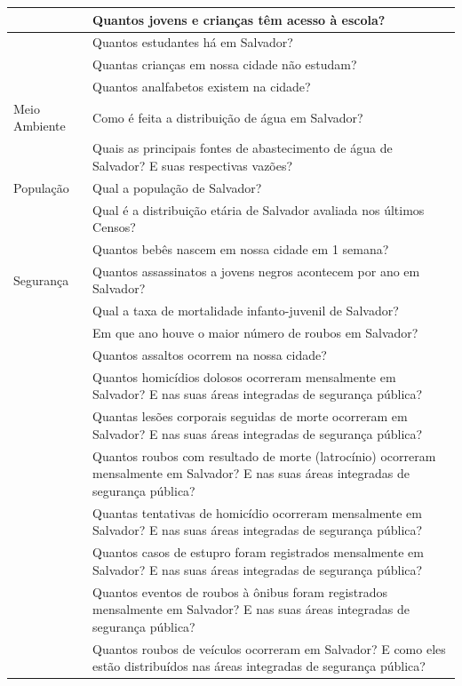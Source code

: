 \documentclass[
]{book}
\begin{document}
\begin{table}
\begin{tabular}[t]{l|l}
\hline
 & Quantos jovens e crianças têm acesso à escola?\\
\hline
 & Quantos estudantes há em Salvador?\\
\hline
 & Quantas crianças em nossa cidade não estudam?\\
\hline
 & Quantos analfabetos existem na cidade?\\
\hline
Meio Ambiente & Como é feita a distribuição de água em Salvador?\\
\hline
 & Quais as principais fontes de abastecimento de água de Salvador? E suas respectivas vazões?\\
\hline
População & Qual a população de Salvador?\\
\hline
 & Qual é a distribuição etária de Salvador avaliada nos últimos Censos?\\
\hline
 & Quantos bebês nascem em nossa cidade em 1 semana?\\
\hline
Segurança & Quantos assassinatos a jovens negros acontecem por ano em Salvador?\\
\hline
 & Qual a taxa de mortalidade infanto-juvenil de Salvador?\\
\hline
 & Em que ano houve o maior número de roubos em Salvador?\\
\hline
 & Quantos assaltos ocorrem na nossa cidade?\\
\hline
 & Quantos homicídios dolosos ocorreram mensalmente em Salvador? E nas suas áreas integradas de segurança pública?\\
\hline
 & Quantas lesões corporais seguidas de morte ocorreram em Salvador? E nas suas áreas integradas de segurança pública?\\
\hline
 & Quantos roubos com resultado de morte (latrocínio) ocorreram mensalmente em Salvador? E nas suas áreas integradas de segurança pública?\\
\hline
 & Quantas tentativas de homicídio ocorreram mensalmente em Salvador? E nas suas áreas integradas de segurança pública?\\
\hline
 & Quantos casos de estupro foram registrados mensalmente em Salvador? E nas suas áreas integradas de segurança pública?\\
\hline
 & Quantos eventos de roubos à ônibus foram registrados mensalmente em Salvador? E nas suas áreas integradas de segurança pública?\\
\hline
 & Quantos roubos de veículos ocorreram em Salvador? E como eles estão distribuídos nas áreas integradas de segurança pública?\\

\end{tabular}
\end{table}
\end{document}
